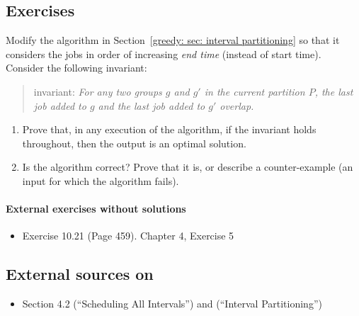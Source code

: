 \subsection{Exercises}

\exercise\label{greedy: exercise: interval partitioning}
Modify the  algorithm in Section~\ref{greedy: sec: interval partitioning}
so that it considers the jobs in order of increasing \emph{end time} (instead of start time).
Consider the following invariant:
\begin{quote}
  \textsf{invariant:}
  \em
  For any two groups $g$ and $g'$ in the current partition $P$,
  the last job added to $g$ and the last job added to $g'$ overlap.
\end{quote}

\begin{enumerate}[label=(\alph*)] 
\item
  Prove that, in any execution of the algorithm, if the invariant holds throughout,
  then the output is an optimal solution.
\item
  Is the algorithm correct?
  Prove that it is, or describe a counter-example
  (an input for which the algorithm fails).
\end{enumerate}

\paragraph{External exercises without solutions}
\begin{itemize}
  \item \LLM Exercise 10.21 (Page 459). \JE Chapter 4, Exercise 5
  \end{itemize}
  

\subsection{External sources on }

\begin{itemize}
\item \KT Section 4.2 (``Scheduling All Intervals'') and \KWSlides (``Interval Partitioning'')
\end{itemize}




